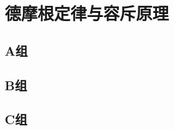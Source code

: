 

\stopexercise

\section{德摩根定律与容斥原理}

\startexercise

\subsection*{A组}




\subsection*{B组}




\subsection*{C组}



\stopexercise
